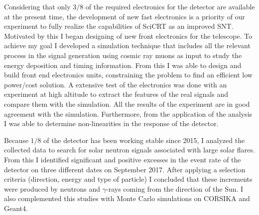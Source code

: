 Considering that only $3/8$ of the required electronics for the detector are available at the present time, the development of new fast electronics is a priority of our experiment to fully realize the capabilities of SciCRT as an improved SNT. Motivated by this I began designing of new front electronics for the telescope. To achieve my goal I developed a simulation technique that includes all the relevant process in the signal generation using cosmic ray muons as input to study the energy deposition and timing information. From this I was able to design and build front end electronics units, constraining the problem to find an efficient low power/cost solution. A extensive test of the electronics was done with an experiment at high altitude to extract the features of the real signals and compare them with the simulation. All the results of the experiment are in good agreement with the simulation. Furthermore, from the application of the analysis I was able to determine non-linearities in the response of the detector.

Because $1/8$ of the detector has been working stable since \num{2015}, I analyzed the collected data to search for solar neutron signals associated with large solar flares. From this I identified significant and positive excesses in the event rate of the detector on three different dates on September \num{2017}. After applying a selection criteria (direction, energy and type of particle) I concluded that these increments were produced by neutrons and $\gamma$-rays coming from the direction of the Sun. I also complemented this studies with Monte Carlo simulations on CORSIKA and Geant4. 
